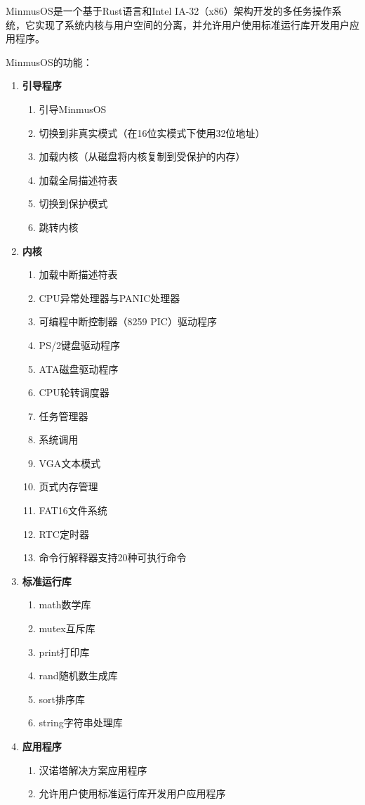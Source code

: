 MinmusOS是一个基于Rust语言和Intel IA-32（x86）架构开发的多任务操作系统，它实现了系统内核与用户空间的分离，并允许用户使用标准运行库开发用户应用程序。

MinmusOS的功能：

\begin{enumerate}
    \item \textbf{引导程序}
          \begin{enumerate}
              \item 引导MinmusOS
              \item 切换到非真实模式（在16位实模式下使用32位地址）
              \item 加载内核（从磁盘将内核复制到受保护的内存）
              \item 加载全局描述符表
              \item 切换到保护模式
              \item 跳转内核
          \end{enumerate}
    \item \textbf{内核}
          \begin{enumerate}
              \item 加载中断描述符表
              \item CPU异常处理器与PANIC处理器
              \item 可编程中断控制器（8259 PIC）驱动程序
              \item PS/2键盘驱动程序
              \item ATA磁盘驱动程序
              \item CPU轮转调度器
              \item 任务管理器
              \item 系统调用
              \item VGA文本模式
              \item 页式内存管理
              \item FAT16文件系统
              \item RTC定时器
              \item 命令行解释器支持20种可执行命令
          \end{enumerate}
    \item \textbf{标准运行库}
          \begin{enumerate}
              \item math数学库
              \item mutex互斥库
              \item print打印库
              \item rand随机数生成库
              \item sort排序库
              \item string字符串处理库
          \end{enumerate}
    \item \textbf{应用程序}
          \begin{enumerate}
              \item 汉诺塔解决方案应用程序
              \item 允许用户使用标准运行库开发用户应用程序
          \end{enumerate}
\end{enumerate}

